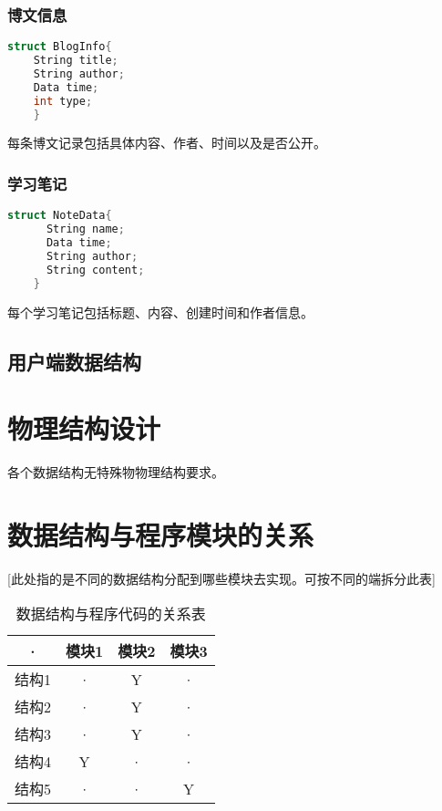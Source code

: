   \subsubsection{博文信息}
  \begin{lstlisting}[language=C,caption=博文信息]
    struct BlogInfo{
    String title;
    String author;
    Data time;
    int type;
    }
  \end{lstlisting}
  每条博文记录包括具体内容、作者、时间以及是否公开。
  \subsubsection{学习笔记}
  \begin{lstlisting}[language=C,caption=学习笔记]
    struct NoteData{
      String name;
      Data time;
      String author;
      String content;
    }
  \end{lstlisting}
  每个学习笔记包括标题、内容、创建时间和作者信息。








  \subsection{用户端数据结构}

\section{物理结构设计}
各个数据结构无特殊物物理结构要求。

\section{数据结构与程序模块的关系}
[此处指的是不同的数据结构分配到哪些模块去实现。可按不同的端拆分此表]
\begin{table}[htbp]
\centering
\caption{数据结构与程序代码的关系表} \label{tab:datastructure-module}
\begin{tabular}{|c|c|c|c|}
    \hline
    · & 模块1 & 模块2 & 模块3 \\
    \hline
    结构1 & · & Y & · \\
    \hline
    结构2 & · & Y & · \\
    \hline
    结构3 & · & Y & · \\
    \hline
    结构4 & Y & · & · \\
    \hline
    结构5 & · & · & Y \\
    \hline
\end{tabular}
\end{table}
